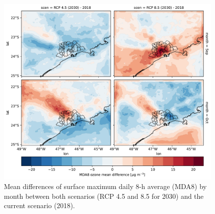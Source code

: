 \begin{figure}[hbt]
\begin{center}
	\includegraphics[width=1\textwidth]{fig/map_mda8_diff.pdf}
\end{center}
  \caption{Mean differences of surface maximum daily 8-h average (MDA8) by month between both scenarios (RCP 4.5 and 8.5 for 2030) and the current scenario (2018).}
  \label{fig:spatial_diff_o3}
\end{figure}


   

